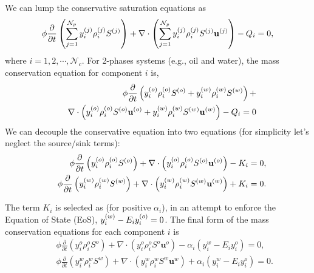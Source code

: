 We can lump the conservative saturation equations as
    \begin{equation}
              \phi \displaystyle\frac{\partial}{\partial t}\left(\summation_{j=1}^{{\cal N}_p}\mfr[y]{i}{j}\mfr[\rho]{i}{j}\mfr[S]{}{j}\right) + \nabla\cdot\left(\summation_{j=1}^{{\cal N}_p}\mfr[y]{i}{j}\mfr[\rho]{i}{j}\mfr[S]{}{j}\mfr[\mathbf{u}]{}{j}\right) - Q_{i} = 0, \label{saturation_compositional_4}
    \end{equation} 
where $i = 1, 2, \cdots, \mathcal{N}_{c}$. For 2-phases systems (e.g., oil and water), the mass conservation equation for component $i$ is,  
     \begin{eqnarray}
             &&\phi \displaystyle\frac{\partial}{\partial t}\left(\mfr[y]{i}{o}\mfr[\rho]{i}{o}\mfr[S]{}{o} +  \mfr[y]{i}{w}\mfr[\rho]{i}{w}\mfr[S]{}{w}\right) + \nonumber \\
             && \nabla\cdot\left(\mfr[y]{i}{o} \mfr[\rho]{i}{o}\mfr[S]{}{o}\mfr[\mathbf{u}]{}{o} + \mfr[y]{i}{w}\mfr[\rho]{i}{w}\mfr[S]{}{w}\mfr[\mathbf{u}]{}{w} \right) - Q_{i} = 0 \nonumber
    \end{eqnarray}
We can decouple the conservative equation into two equations (for simplicity let's neglect the source/sink terms): 
          \begin{eqnarray}
             && \phi \displaystyle\frac{\partial}{\partial t}\left(\mfr[y]{i}{o}\mfr[\rho]{i}{o}\mfr[S]{}{o} \right) + \nabla\cdot\left(\mfr[y]{i}{o}\mfr[\rho]{i}{o}\mfr[S]{}{o}\mfr[\mathbf{u}]{}{o}  \right) - K_i  = 0, \nonumber \\
             && \phi \displaystyle\frac{\partial}{\partial t}\left(\mfr[y]{i}{w}\mfr[\rho]{i}{w}\mfr[S]{}{w}  \right) + \nabla\cdot\left(\mfr[y]{i}{w}\mfr[\rho]{i}{w}\mfr[S]{}{w}\mfr[\mathbf{u}]{}{w} \right) + K_i = 0.  \nonumber
          \end{eqnarray}

The term $K_{i}$ is selected as  (for positive $\alpha_{i}$), in an attempt to enforce the Equation of State (EoS),  $\mfr[y]{i}{w} - E_i \mfr[y]{i}{o}=0$.  The final form of the mass conservation equations for each component $i$ is 
           \begin{eqnarray}
               && \phi  \displaystyle\frac{\partial}{\partial t}\left(y_{i}^{o}\rho_i^{o}S^{o} \right) + \nabla\cdot\left(y_{i}^{o}\rho_i^{o}S^{o}\mathbf{u}^{o}  \right) - \alpha_i (y_i^w - E_i y_i^o)  = 0, \label{oil-comp-i} \nonumber\\
               && \phi \displaystyle\frac{\partial}{\partial t}\left(y_{i}^{w}\rho_i^{w}S^{w}  \right) +  \nabla\cdot\left( y_{i}^{w}\rho_i^{w}S^{w}\mathbf{u}^{w}  \right) + \alpha_i (y_i^w - E_i y_i^o) = 0. \label{water-comp-i} \nonumber\label{Chapter:CompositionalModel:Section:MultiComponentFormulation:Section:2PhaseSystem:Eqn:MassConservationSaturation}
           \end{eqnarray}

